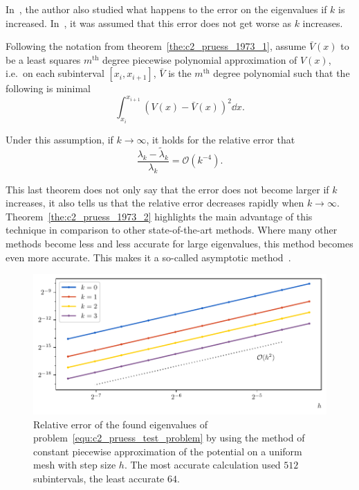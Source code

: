 In~\cite{pruess_estimating_1973}, the author also studied what happens to the error on the eigenvalues if $k$ is increased. In~\cite{canosa_new_1970}, it was assumed that this error does not get worse as $k$ increases.

\begin{theorem}[Pruess 1973]\label{the:c2_pruess_1973_2}
    Following the notation from theorem~\ref{the:c2_pruess_1973_1}, assume $\bar{V}(x)$ to be a least squares $m^\text{th}$ degree piecewise polynomial approximation of $V(x)$, i.e.~on each subinterval $[x_i, x_{i+1}]$, $\bar{V}$ is the $m^\text{th}$ degree polynomial such that the following is minimal
    $$
        \int_{x_i}^{x_{i+1}} \left(V(x) - \bar{V}(x)\right)^2 \dd x \text{.}
    $$

    Under this assumption, if $k \to \infty$, it holds for the relative error that
    $$
        \frac{\lambda_k - \tilde{\lambda}_k}{\lambda_k} = \mathcal{O}(k^{-4})\text{.}
    $$
\end{theorem}

This last theorem does not only say that the error does not become larger if $k$ increases, it also tells us that the relative error decreases rapidly when $k \to \infty$. Theorem~\ref{the:c2_pruess_1973_2} highlights the main advantage of this technique in comparison to other state-of-the-art methods. Where many other methods become less and less accurate for large eigenvalues, this method becomes even more accurate. This makes it a so-called asymptotic method~\cite{kuzmina_asymptotic_2000,zhukova_asymptotic_2020}.


\begin{figure}
    \begin{center}
        \includegraphics[width=\textwidth]{img/chapter2/pruess_h_error.pdf}
    \end{center}
    \caption{Relative error of the found eigenvalues of problem~\eqref{equ:c2_pruess_test_problem} by using the method of constant piecewise approximation of the potential on a uniform mesh with step size $h$. The most accurate calculation used $512$ subintervals, the least accurate $64$.}
    \label{fig:c2_pruess_h_error}
\end{figure}

